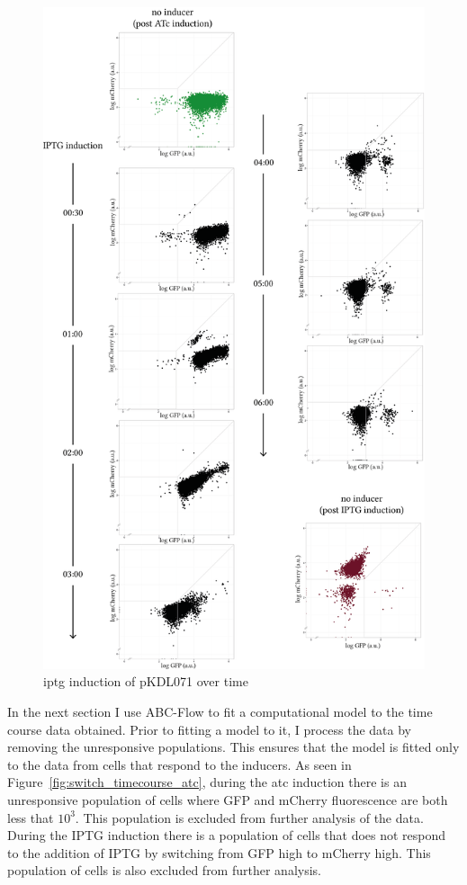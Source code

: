 \begin{figure}[tb]
	\begin{center}
\includegraphics[scale=0.7]{../../chapters/chapterABCFlow/images/pKDL071_iptg_time.png}
\caption[\acrshort{iptg} induction of pKDL071 over time]{\label{fig:switch_timecourse_iptg} \acrshort{iptg} induction of pKDL071 over time}
\end{center}
\end{figure}
\clearpage

In the next section I use ABC-Flow to fit a computational model to the time course data obtained. Prior to fitting a model to it, I process the data by removing the unresponsive populations. This ensures that the model is fitted only to the data from cells that respond to the inducers. As seen in Figure~\ref{fig:switch_timecourse_atc}, during the \acrshort{atc} induction there is an unresponsive population of cells where GFP and mCherry fluorescence are both less that $10^3$. This population is excluded from further analysis of the data. During the IPTG induction there is a population of cells that does not respond to the addition of IPTG by switching from GFP high to mCherry high. This population of cells is also excluded from further analysis. 

